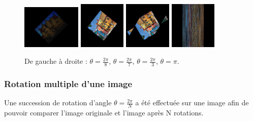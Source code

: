 \documentclass[12pt]{article}
\begin{document}
\begin{figure}[h]
	\includegraphics[width=0.25\textwidth]{castle_bruite_2pi_over_8.png}
	\includegraphics[width=0.20\textwidth]{house_rotation_2pi_over_7.png}
    \includegraphics[width=0.20\textwidth]{house_rotation_2pi_over_3.png}
    \includegraphics[width=0.20\textwidth]{house_rotation_pi.png}
    \caption{De gauche à droite : $\theta = \frac{2\pi}{8}$, $\theta = \frac{2\pi}{7}$, $\theta = \frac{2\pi}{3}$, $\theta = \pi$. }
    
\end{figure}



\subsubsection{Rotation multiple d'une image}

Une succession de rotation d'angle $\theta = \frac{2\pi}{N}$ a été effectuée sur une image afin de pouvoir comparer l'image originale et l'image après N rotations. 
\end{document}
